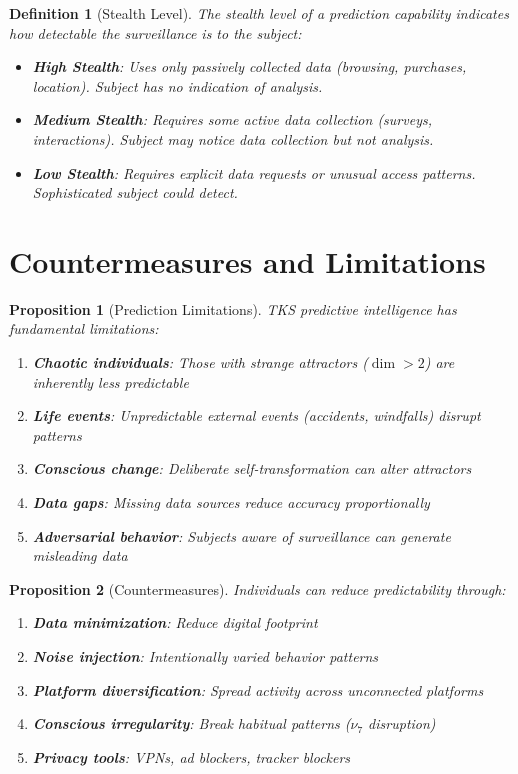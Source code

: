 \documentclass[11pt,twoside]{book}
\newcommand{\noe}[1]{\nu_{#1}}
\newtheorem{definition}{Definition}[chapter]
\newtheorem{proposition}{Proposition}[chapter]
\begin{document}
\begin{definition}[Stealth Level]
\label{def:stealth}
The \emph{stealth level} of a prediction capability indicates how detectable the surveillance is to the subject:

\begin{itemize}
    \item \textbf{High Stealth}: Uses only passively collected data (browsing, purchases, location). Subject has no indication of analysis.
    \item \textbf{Medium Stealth}: Requires some active data collection (surveys, interactions). Subject may notice data collection but not analysis.
    \item \textbf{Low Stealth}: Requires explicit data requests or unusual access patterns. Sophisticated subject could detect.
\end{itemize}
\end{definition}

\section{Countermeasures and Limitations}

\begin{proposition}[Prediction Limitations]
\label{prop:limitations}
TKS predictive intelligence has fundamental limitations:

\begin{enumerate}
    \item \textbf{Chaotic individuals}: Those with strange attractors ($\dim > 2$) are inherently less predictable
    \item \textbf{Life events}: Unpredictable external events (accidents, windfalls) disrupt patterns
    \item \textbf{Conscious change}: Deliberate self-transformation can alter attractors
    \item \textbf{Data gaps}: Missing data sources reduce accuracy proportionally
    \item \textbf{Adversarial behavior}: Subjects aware of surveillance can generate misleading data
\end{enumerate}
\end{proposition}

\begin{proposition}[Countermeasures]
\label{prop:countermeasures}
Individuals can reduce predictability through:

\begin{enumerate}
    \item \textbf{Data minimization}: Reduce digital footprint
    \item \textbf{Noise injection}: Intentionally varied behavior patterns
    \item \textbf{Platform diversification}: Spread activity across unconnected platforms
    \item \textbf{Conscious irregularity}: Break habitual patterns ($\noe{7}$ disruption)
    \item \textbf{Privacy tools}: VPNs, ad blockers, tracker blockers
\end{enumerate}
\end{proposition}
\end{document}
